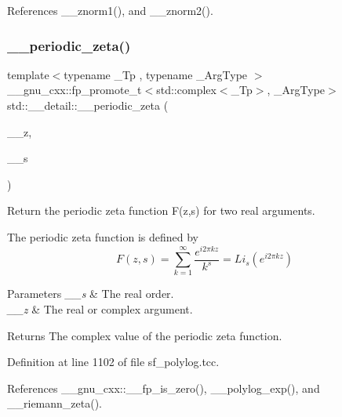 References \+\_\+\+\_\+znorm1(), and \+\_\+\+\_\+znorm2().

\mbox{\label{namespacestd_1_1____detail_a1d65d34f43558441e4ed83d84dbc9ddf}} 
\subsubsection{\texorpdfstring{\+\_\+\+\_\+periodic\+\_\+zeta()}{\_\_periodic\_zeta()}}
{\footnotesize\ttfamily template$<$typename \+\_\+\+Tp , typename \+\_\+\+Arg\+Type $>$ \\
\+\_\+\+\_\+gnu\+\_\+cxx\+::fp\+\_\+promote\+\_\+t$<$std\+::complex$<$\+\_\+\+Tp$>$, \+\_\+\+Arg\+Type$>$ std\+::\+\_\+\+\_\+detail\+::\+\_\+\+\_\+periodic\+\_\+zeta (\begin{DoxyParamCaption}\item[{\+\_\+\+Arg\+Type}]{\+\_\+\+\_\+z,  }\item[{\+\_\+\+Tp}]{\+\_\+\+\_\+s }\end{DoxyParamCaption})}

Return the periodic zeta function F(z,s) for two real arguments.

The periodic zeta function is defined by \[ F(z,s) = \sum_{k=1}^{\infty} \frac{e^{i2\pi kz}}{k^s} = Li_s(e^{i2\pi kz}) \]


\begin{DoxyParams}{Parameters}
{\em \+\_\+\+\_\+s} & The real order. \\
\hline
{\em \+\_\+\+\_\+z} & The real or complex argument. \\
\hline
\end{DoxyParams}
\begin{DoxyReturn}{Returns}
The complex value of the periodic zeta function. 
\end{DoxyReturn}


Definition at line 1102 of file sf\+\_\+polylog.\+tcc.



References \+\_\+\+\_\+gnu\+\_\+cxx\+::\+\_\+\+\_\+fp\+\_\+is\+\_\+zero(), \+\_\+\+\_\+polylog\+\_\+exp(), and \+\_\+\+\_\+riemann\+\_\+zeta().

\mbox{\label{namespacestd_1_1____detail_ac69e259ad511fcc7a54c6ec315adcfa4}} 
